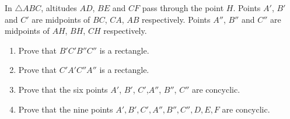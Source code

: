 \begin{question}
    In $\triangle ABC$, altitudes $AD$, $BE$ and $CF$ pass through the point
    $H$. Points $A'$, $B'$ and $C'$ are midpoints of $BC$, $CA$, $AB$
    respectively. Points $A''$, $B''$ and $C''$ are midpoints of $AH$, $BH$,
    $CH$ respectively. 
    \begin{enumerate}
        \item Prove that $B'C'B''C''$ is a rectangle. 
        
        \item Prove that $C'A'C''A''$ is a rectangle.
        
        \item Prove that the six points $A'$, $B'$, $C'$,$A''$, $B''$, $C''$
            are concyclic. 
        
        \item Prove that the nine points $A',B',C',A'',B'',C'',D,E,F$ are
            concyclic. 
    \end{enumerate}
\end{question}
